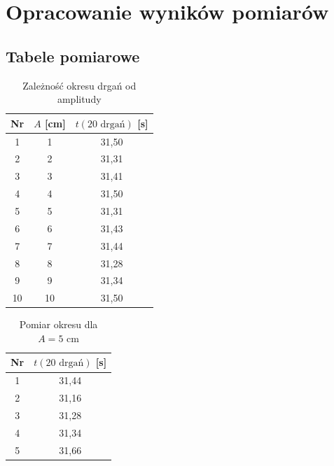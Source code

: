 \documentclass[a4paper,12pt]{article}
\begin{document}
\section{Opracowanie wyników pomiarów}

\subsection{Tabele pomiarowe}

\begin{table}[H]
    \centering
    \begin{tabular}{|c|c|c|}
        \hline
        Nr & $A$ [cm] & $t(20 \text{ drgań})$ [s] \\
        \hline
        1  & 1 & 31,50 \\
        2  & 2 & 31,31 \\
        3  & 3 & 31,41 \\
        4  & 4 & 31,50 \\
        5  & 5 & 31,31 \\
        6  & 6 & 31,43 \\
        7  & 7 & 31,44 \\
        8  & 8 & 31,28 \\
        9  & 9 & 31,34 \\
        10 & 10 & 31,50 \\
        \hline
    \end{tabular}
    \caption{Zależność okresu drgań od amplitudy}
\end{table}

\begin{table}[H]
    \centering
    \begin{tabular}{|c|c|}
        \hline
        Nr & $t(20 \text{ drgań})$ [s] \\
        \hline
        1 & 31,44 \\
        2 & 31,16 \\
        3 & 31,28 \\
        4 & 31,34 \\
        5 & 31,66 \\
        \hline
    \end{tabular}
    \caption{Pomiar okresu dla $A = 5 \text{ cm}$}
    \label{tab:okres_5cm}
\end{table}
\end{document}
